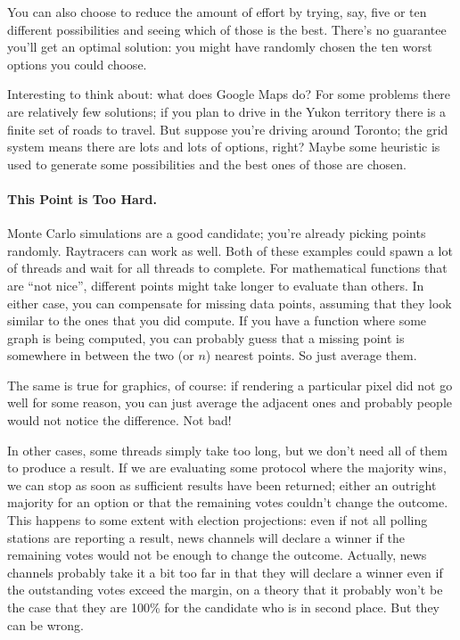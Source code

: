 You can also choose to reduce the amount of effort by trying, say, five or ten different possibilities and seeing which of those is the best. There's no guarantee you'll get an optimal solution: you might have randomly chosen the ten worst options you could choose. 

Interesting to think about: what does Google Maps do? For some problems there are relatively few solutions; if you plan to drive in the Yukon territory there is a finite set of roads to travel. But suppose you're driving around Toronto; the grid system means there are lots and lots of options, right? Maybe some heuristic is used to generate some possibilities and the best ones of those are chosen.


\paragraph{This Point is Too Hard.} Monte Carlo simulations
are a good candidate; you're already picking points randomly.
Raytracers can work as well. Both of these examples could spawn a lot
of threads and wait for all threads to complete. For mathematical functions that are ``not nice'', different points might take longer to evaluate than others. 
In either case, you
can compensate for missing data points, assuming that they look similar to
the ones that you did compute. If you have a function where some graph is being
computed, you can probably guess that a missing point is somewhere in between the two (or $n$) nearest points. So just average them.

The same is true for graphics, of course: if rendering a particular pixel did
not go well for some reason, you can just average the adjacent ones and probably
people would not notice the difference. Not bad!

In other cases, some threads simply take too long, but we don't need all of them to produce a result. If we are evaluating some protocol where the majority wins, we can stop as soon as sufficient results have been returned; either an outright majority for an option or that the remaining votes couldn't change the outcome. This happens to some extent with election projections: even if not all polling stations are reporting a result, news channels will declare a winner if the remaining votes would not be enough to change the outcome. Actually, news channels probably take it a bit too far in that they will declare a winner even if the outstanding votes exceed the margin, on a theory that it probably won't be the case that they are 100\% for the candidate who is in second place. But they can be wrong.

